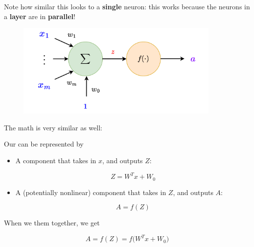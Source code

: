         Note how similar this looks to a \textbf{single} neuron: this works because the neurons in a \textbf{layer} are in \textbf{parallel}!
        
        \begin{figure}[H]
            \centering
            \includegraphics[width=100mm,scale=0.4]{images/nn_images/full_neuron.png}
        \end{figure}
        
        The math is very similar as well:\\
        
        \begin{definition}
            Our  can be represented by
            
            \begin{itemize}
                \item A  component that takes in $x$, and outputs  $Z$:
                
                \begin{equation*}
                    Z = W^T x + W_0
                \end{equation*}
                
                \item A (potentially nonlinear)  component that takes in $Z$, and outputs  $A$:
                
                \begin{equation*}
                    A = f(Z)
                \end{equation*}
                
            \end{itemize}
        
            When we  them together, we get
                
                \begin{equation*}
                    A = f(Z) = f \Big( W^Tx+W_0 \Big)
                \end{equation*}
        \end{definition}
        